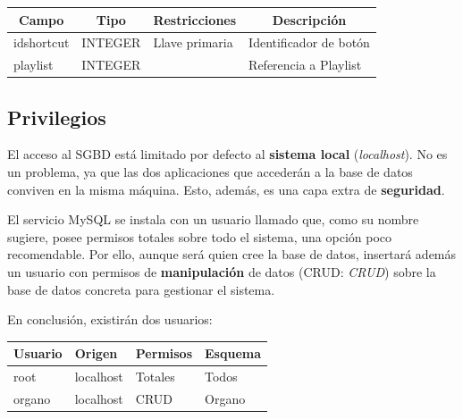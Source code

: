 \smallskip

\smallskip

\begin{center}
	\begin{tabular}{|l|l|l|l|}
		\hline \multicolumn{1}{|c|}{\textbf{Campo}} & \multicolumn{1}{c|}{\textbf{Tipo}} & \multicolumn{1}{c|}{\textbf{Restricciones}} & \multicolumn{1}{c|}{\textbf{Descripción}} \\
		\hline idshortcut & INTEGER & Llave primaria & Identificador de botón \\ 
		\hline playlist & INTEGER & & Referencia a Playlist \\ 
		\hline 
	\end{tabular}
	\smallskip
\end{center}

\smallskip

\subsection{Privilegios}

El acceso al \acrshort{SGBD} está limitado por defecto al \textbf{sistema local} (\textit{localhost}). No es un problema, ya que las dos aplicaciones que accederán a la base de datos conviven en la misma máquina. Esto, además, es una capa extra de \textbf{seguridad}.

El servicio MySQL se instala con un usuario llamado \textbf{} que, como su nombre sugiere, posee permisos totales sobre todo el sistema, una opción poco recomendable. Por ello, aunque será  quien cree la base de datos, insertará además un usuario con permisos de \textbf{manipulación} de datos (\acrshort{CRUD}: \textit{\acrlong{CRUD}}) sobre la base de datos concreta para gestionar el sistema.

En conclusión, existirán dos usuarios:

\smallskip

\begin{center}
	\begin{tabular}{|l|l|l|l|}
		\hline \textbf{Usuario} & \textbf{Origen} & \textbf{Permisos} & \textbf{Esquema} \\ 
		\hline root & localhost & Totales & Todos \\
		\hline organo & localhost & \acrshort{CRUD} & Organo \\ 
		\hline 
	\end{tabular}
	\smallskip
\end{center}

